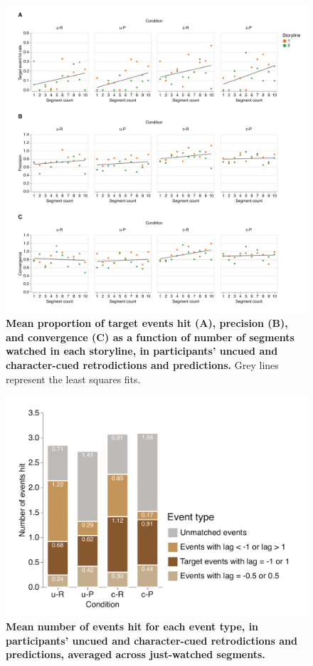 \documentclass[10pt]{article}
\begin{document}
\begin{figure}[tp]
    \centering
    \includegraphics[width=\textwidth]{supp1.pdf}
    \caption{\textbf{Mean proportion of target events hit (A), precision (B), and convergence (C) as a function of number of segments watched in each storyline, in participants' uncued and character-cued retrodictions and predictions.} Grey lines represent the least squares fits.}
    \label{fig:supp1}
\end{figure}

\begin{figure}[tp]
    \centering
    \includegraphics[width=\textwidth]{supp2.pdf}
    \caption{\textbf{Mean number of events hit for each event type, in participants' uncued and character-cued retrodictions and predictions, averaged across just-watched segments.}}
    \label{fig:supp2}
\end{figure}
\end{document}
